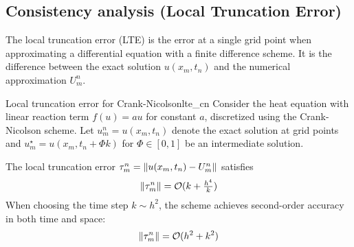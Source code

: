 \subsection{Consistency analysis (Local Truncation Error)}
The local truncation error (LTE) is the error at a single grid point when approximating a differential equation with a finite difference scheme.
It is the difference between the exact solution \(u(x_m, t_n)\) and the numerical approximation \(U_m^n\).

\begin{theorem}{Local truncation error for Crank-Nicolson}{lte_cn}
  Consider the heat equation with linear reaction term \(f(u) = au\) for constant \(a\), discretized using the Crank-Nicolson scheme. Let \(u_m^n = u(x_m,t_n)\) denote the exact solution at grid points and \(u_m^\star = u(x_m, t_n + \Phi k)\) for \(\Phi \in [0,1]\) be an intermediate solution.

  The local truncation error \(\tau_m^n = \lVert u(x_m, t_n) - U_m^n\rVert\) satisfies
  \[
    \lVert\tau_m^n\rVert = \mathcal{O}(k + \tfrac{h^4}{k})
  \]
  When choosing the time step \(k \sim h^2\), the scheme achieves second-order accuracy in both time and space:
  \[
    \lVert\tau_m^n\rVert = \mathcal{O}(h^2 + k^2)
  \]
\end{theorem}
